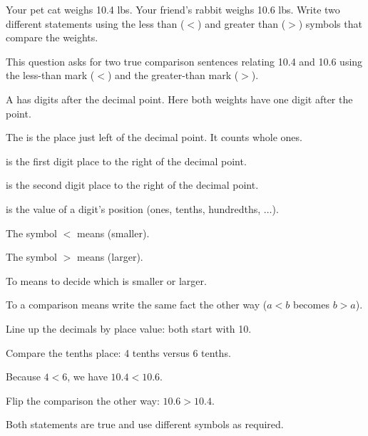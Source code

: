 


Your pet cat weighs 10.4 lbs. Your friend's rabbit weighs 10.6 lbs. Write two different statements using the less than ($<$) and greater than ($>$) symbols that compare the weights.


This question asks for two true comparison sentences relating 10.4 and 10.6 using the less-than mark ($<$) and the greater-than mark ($>$).

\begin{words}
  \item A has digits after the decimal point. Here both weights have one digit after the point.
  \item The is the place just left of the decimal point. It counts whole ones.
  \item {}is the first digit place to the right of the decimal point.
  \item {}is the second digit place to the right of the decimal point.
  \item {}is the value of a digit's position (ones, tenths, hundredths, $\ldots$).
  \item The symbol $<$ means (smaller).
  \item The symbol $>$ means (larger).
  \item To means to decide which is smaller or larger.
  \item To a comparison means write the same fact the other way ($a < b$ becomes $b > a$).
\end{words}

\begin{steps}
  \item Line up the decimals by place value: both start with 10.
  \item Compare the tenths place: 4 tenths versus 6 tenths.
  \item Because $4 < 6$, we have $10.4 < 10.6$.
  \item Flip the comparison the other way: $10.6 > 10.4$.
  \item Both statements are true and use different symbols as required.
\end{steps}

